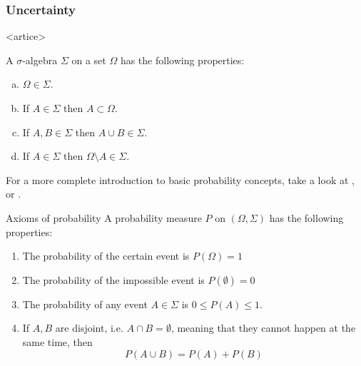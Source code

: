 \begin{frame}
  \frametitle{Uncertainty}
  \only<artice>{
    \begin{definition}
      A $\sigma$-algebra $\Sigma$ on a set $\Omega$ has the following properties:
      \begin{enumerate}[(a)]
      \item $\Omega \in \Sigma$.
      \item If $A \in \Sigma$ then $A \subset \Omega$.
      \item If $A, B \in \Sigma$ then $A \cup B \in \Sigma$.
      \item If $A \in \Sigma$ then $\Omega \setminus A \in \Sigma$.
      \end{enumerate}
    \end{definition}
    For a more complete introduction to basic probability concepts, take a look at \citep[Appendix B]{dimitrakakis-ortner:dmuurl-book}, or \cite{degroot:optimalstatisticaldecisions}.
  }
  \begin{block}{Axioms of probability}
    A probability measure $P$ on $(\Omega, \Sigma)$ has the following properties:
    \begin{enumerate}
    \item<2-> The probability of the certain event is $P(\Omega) = 1$
    \item<3->The probability of the impossible event is
      $P(\emptyset) = 0$
    \item<4->The probability of any event $A \in \Sigma$ is $0 \leq P(A) \leq 1$.
    \item<5-> If $A, B$ are disjoint, i.e. $A \cap B = \emptyset$, meaning
      that they cannot happen at the same time, then
      \[
      P(A \cup B) = P(A) + P(B)
      \]
    \end{enumerate}
  \end{block}
\end{frame}

